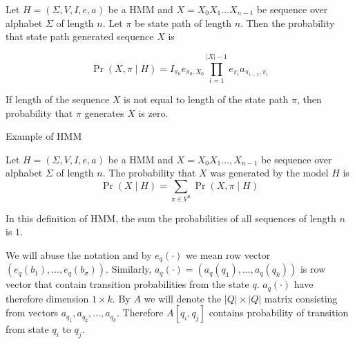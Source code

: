 \begin{definition}
Let $H=(\Sigma,V,I,e,a)$ be a HMM and $X=X_0X_1\dots X_{n-1}$ be sequence over
alphabet $\Sigma$ of length $n$. Let $\pi$ be state path of length $n$. Then the
probability that state path generated sequence $X$ is 

\[\Pr\left(X,\pi\mid H\right) =
I_{\pi_0}e_{\pi_0,X_0}\prod_{i=1}^{|X|-1}e_{\pi_i}a_{\pi_{i-1},\pi_i}\]

If length of the sequence $X$ is not equal to length of the state path $\pi$,
then
probability that $\pi$ generates $X$ is zero.
\end{definition}

\begin{example}
Example of HMM
\end{example}

\begin{definition}
Let $H=(\Sigma,V,I,e,a)$ be a HMM and $X=X_0X_1\dots,X_{n-1}$ be sequence over
alphabet $\Sigma$ of length $n$. The probability that $X$ was generated by the
model $H$ is 
\[\Pr\left(X\mid H\right)=\sum_{\pi\in V^n}\Pr\left(X,\pi\mid H\right)\]
\end{definition}


\begin{note}
In this definition of HMM, the sum the probabilities of all sequences of length
$n$ is $1$.
\end{note}

We will abuse the notation and by $e_q(\cdot)$ we mean row vector
$\left(e_q(b_1),\dots,e_q(b_{\sigma})\right)$. Similarly,
$a_q(\cdot)=\left(a_q(q_1),\dots,a_q(q_k)\right)$ is row vector that contain
transition probabilities from the state $q$.  $a_q(\cdot)$ have therefore
dimension $1\times k$. By $A$ we will denote the $|Q|\times |Q|$ matrix
consisting from vectors $a_{q_1},a_{q_2},\dots,a_{q_k}$.  Therefore $A[q_i,q_j]$
contains probability of transition from state $q_i$ to $q_j$.

